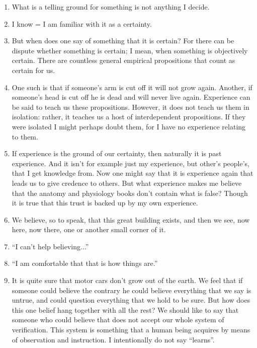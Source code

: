 \documentclass{book}
\begin{document}
\begin{enumerate}
\item
What is a telling ground for something is not anything I decide.

\item
I know = I am familiar with it as a certainty.

\item
But when does one say of something that it is certain?  For there can be
dispute whether something is certain; I mean, when something is objectively
certain.  There are countless general empirical propositions that count as
certain for us.

\item
One such is that if someone's arm is cut off it will not grow again. Another,
if someone's head is cut off he is dead and will never live again.  Experience
can be said to teach us these propositions. However, it does not teach us them
in isolation: rather, it teaches us a host of interdependent propositions. If
they were isolated I might perhaps doubt them, for I have no experience
relating to them.

\item
If experience is the ground of our certainty, then naturally it is past
experience.  And it isn't for example just my experience, but other's people's,
that I get knowledge from.  Now one might say that it is experience again that
leads us to give credence to others. But what experience makes me believe that
the anatomy and physiology books don't contain what is false? Though it is true
that this trust is backed up by my own experience.

\item
We believe, so to speak, that this great building exists, and then we see, now
here, now there, one or another small corner of it.

\item
``I can't help believing...''

\item
``I am comfortable that that is how things are.''

\item
It is quite sure that motor cars don't grow out of the earth. We feel that if
someone could believe the contrary he could believe everything that we say is
untrue, and could question everything that we hold to be sure.  But how does
this one belief hang together with all the rest? We should like to say that
someone who could believe that does not accept our whole system of
verification.  This system is something that a human being acquires by means of
observation and instruction. I intentionally do not say ``learns''.


\end{enumerate}
\end{document}
